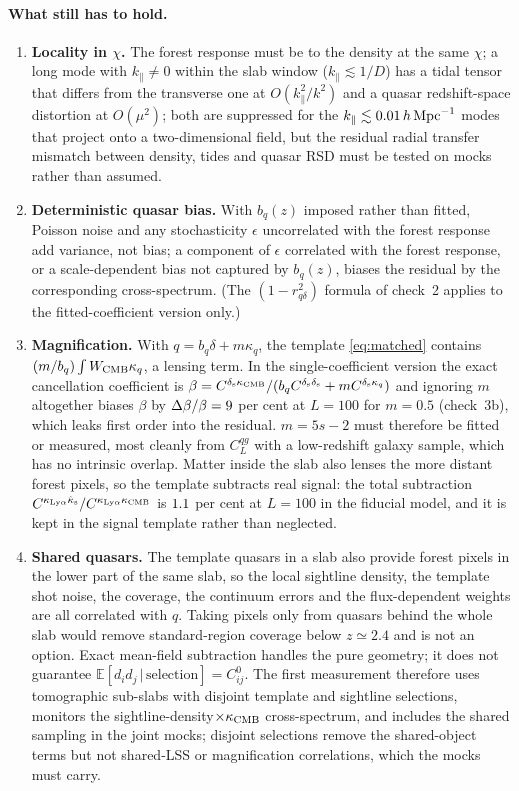 \documentclass[11pt,a4paper]{article}
\newcommand{\kpar}{k_\parallel}
\newcommand{\kcmb}{\kappa_{\rm CMB}}
\newcommand{\klya}{\kappa_{{\rm Ly}\alpha}}
\begin{document}
\paragraph{What still has to hold.}
\begin{enumerate}
\item \textbf{Locality in $\chi$.} The forest response must be to the density at the same $\chi$; a long mode with $\kpar\neq0$ within the slab window ($\kpar\lesssim1/D$) has a tidal tensor that differs from the transverse one at $O(\kpar^2/k^2)$ and a quasar redshift-space distortion at $O(\mu^2)$; both are suppressed for the $\kpar\lesssim0.01\,h\,{\rm Mpc}^{-1}$ modes that project onto a two-dimensional field, but the residual radial transfer mismatch between density, tides and quasar RSD must be tested on mocks rather than assumed.
\item \textbf{Deterministic quasar bias.} With $b_q(z)$ imposed rather than fitted, Poisson noise and any stochasticity $\epsilon$ uncorrelated with the forest response add variance, not bias; a component of $\epsilon$ correlated with the forest response, or a scale-dependent bias not captured by $b_q(z)$, biases the residual by the corresponding cross-spectrum. (The $(1-r^2_{q\delta})$ formula of check~2 applies to the fitted-coefficient version only.)
\item \textbf{Magnification.} With $q=b_q\delta+m\kappa_q$, the template \eqref{eq:matched} contains $(m/b_q)\int W_{\rm CMB}\kappa_q$, a lensing term. In the single-coefficient version the exact cancellation coefficient is $\beta=C^{\delta_{\rm s}\kcmb}/(b_qC^{\delta_{\rm s}\delta_{\rm s}}+mC^{\delta_{\rm s}\kappa_q})$ and ignoring $m$ altogether biases $\beta$ by $\Delta\beta/\beta=9$ per cent at $L=100$ for $m=0.5$ (check~3b), which leaks first order into the residual. $m=5s-2$ must therefore be fitted or measured, most cleanly from $C_L^{qg}$ with a low-redshift galaxy sample, which has no intrinsic overlap. Matter inside the slab also lenses the more distant forest pixels, so the template subtracts real signal: the total subtraction $C^{\klya\hat\kappa_{\rm s}}/C^{\klya\kcmb}$ is $1.1$ per cent at $L=100$ in the fiducial model, and it is kept in the signal template rather than neglected.
\item \textbf{Shared quasars.} The template quasars in a slab also provide forest pixels in the lower part of the same slab, so the local sightline density, the template shot noise, the coverage, the continuum errors and the flux-dependent weights are all correlated with $q$. Taking pixels only from quasars behind the whole slab would remove standard-region coverage below $z\simeq2.4$ and is not an option. Exact mean-field subtraction handles the pure geometry; it does not guarantee $\mathbb E[d_id_j\,|\,\text{selection}]=C^0_{ij}$. The first measurement therefore uses tomographic sub-slabs with disjoint template and sightline selections, monitors the sightline-density$\times\kcmb$ cross-spectrum, and includes the shared sampling in the joint mocks; disjoint selections remove the shared-object terms but not shared-LSS or magnification correlations, which the mocks must carry.

\end{enumerate}
\end{document}

